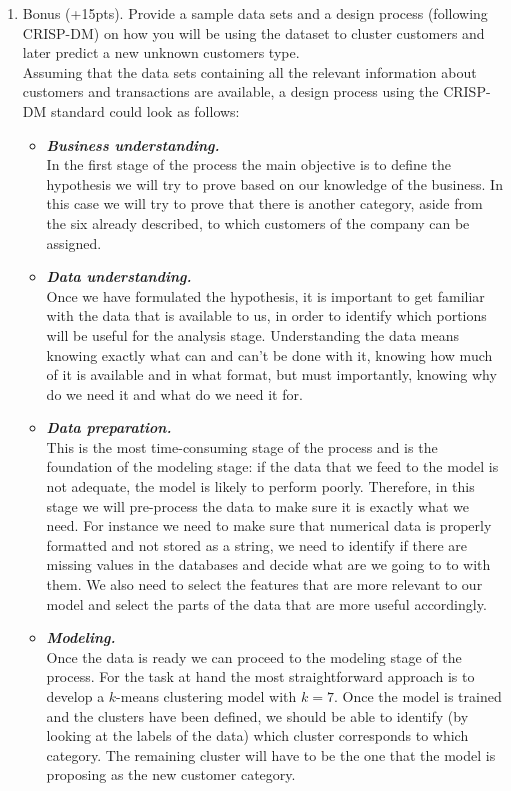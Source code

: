 \documentclass{article}
\begin{document}
\begin{enumerate}[label=(\alph*)]
\begin{enumerate}[label=\arabic*.]
            \item Bonus (+15pts). Provide a sample data sets and a design process (following CRISP-DM) on how you will be using the dataset to cluster customers and later predict a new unknown customers type.\\
\newline
Assuming that the data sets containing all the relevant information about customers and transactions are available, a design process using the CRISP-DM standard could look as follows:
\begin{itemize}
    \item \textbf{\textit{Business understanding.}}\\
    In the first stage of the process the main objective is to define the hypothesis we will try to prove based on our knowledge of the business. In this case we will try to prove that there is another category, aside from the six already described, to which customers of the company can be assigned.
    \item \textbf{\textit{Data understanding.}}\\
    Once we have formulated the hypothesis, it is important to get familiar with the data that is available to us, in order to identify which portions will be useful for the analysis stage. Understanding the data means knowing exactly what can and can't be done with it, knowing how much of it is available and in what format, but must importantly, knowing why do we need it and what do we need it for.
    \item \textbf{\textit{Data preparation.}}\\
    This is the most time-consuming stage of the process and is the foundation of the modeling stage: if the data that we feed to the model is not adequate, the model is likely to perform poorly. Therefore, in this stage we will pre-process the data to make sure it is exactly what we need. For instance we need to make sure that numerical data is properly formatted and not stored as a string, we need to identify if there are missing values in the databases and decide what are we going to to with them. We also need to select the features that are more relevant to our model and select the parts of the data that are more useful accordingly.
    \item \textbf{\textit{Modeling.}}\\
    Once the data is ready we can proceed to the modeling stage of the process. For the task at hand the most straightforward approach is to develop a $k$-means clustering model with $k = 7$. Once the model is trained and the clusters have been defined, we should be able to identify (by looking at the labels of the data) which cluster corresponds to which category. The remaining cluster will have to be the one that the model is proposing as the new customer category.

\end{itemize}
\end{enumerate}
\end{enumerate}
\end{document}
